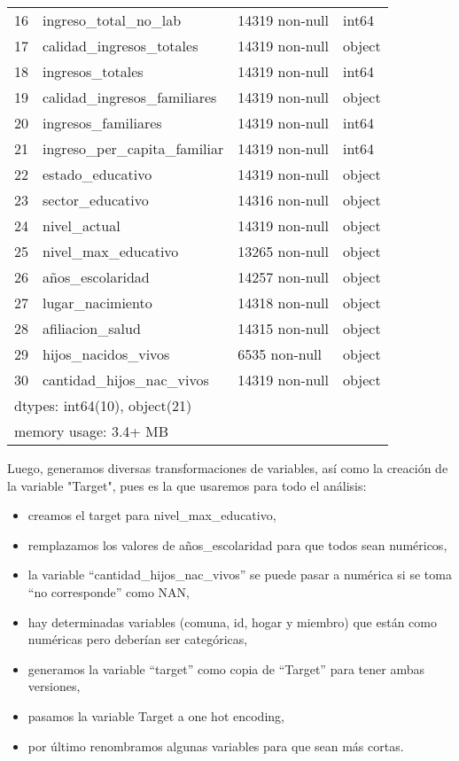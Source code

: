 \documentclass[a4paper]{article}
\begin{document}
\begin{table}[H]
\begin{center}
\begin{tabular}{clll}
    16 & ingreso\_total\_no\_lab        & 14319 non-null & int64  \\
    17 & calidad\_ingresos\_totales    & 14319 non-null & object \\
    18 & ingresos\_totales            & 14319 non-null & int64  \\
    19 & calidad\_ingresos\_familiares & 14319 non-null & object \\
    20 & ingresos\_familiares         & 14319 non-null & int64  \\
    21 & ingreso\_per\_capita\_familiar & 14319 non-null & int64  \\
    22 & estado\_educativo            & 14319 non-null & object \\
    23 & sector\_educativo            & 14316 non-null & object \\
    24 & nivel\_actual                & 14319 non-null & object \\
    25 & nivel\_max\_educativo         & 13265 non-null & object \\
    26 & años\_escolaridad            & 14257 non-null & object \\
    27 & lugar\_nacimiento            & 14318 non-null & object \\
    28 & afiliacion\_salud            & 14315 non-null & object \\
    29 & hijos\_nacidos\_vivos         & 6535 non-null  & object \\
    30 & cantidad\_hijos\_nac\_vivos    & 14319 non-null & object \\
    \multicolumn{4}{l}{dtypes: int64(10), object(21)}  \\ 
    \multicolumn{4}{l}{memory usage: 3.4+ MB} \\
    \end{tabular}\end{center}
    \end{table}
        
    Luego, generamos diversas transformaciones de variables, así como la creación de la variable "Target", pues es la que usaremos para todo el análisis:
    \begin{itemize}
        \item creamos el target para nivel\_max\_educativo,
        \item remplazamos los valores de años\_escolaridad para que todos sean numéricos,
        \item la variable ``cantidad\_hijos\_nac\_vivos'' se puede pasar a numérica si se toma ``no corresponde'' como NAN,
        \item hay determinadas variables (comuna, id, hogar y miembro) que están como numéricas pero deberían ser categóricas,
        \item generamos la variable ``target'' como copia de ``Target'' para tener ambas versiones,
        \item pasamos la variable Target a one hot encoding,
        \item por último renombramos algunas variables para que sean más cortas.
    \end{itemize}
\end{document}
